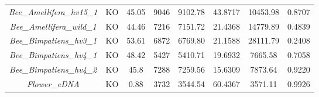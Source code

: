 \documentclass[11pt]{article}
\begin{document}
\begin{table}[H]
{\begin{tabular}{cccccccc}
\textit{Bee\_Amellifera\_hv15\_1}&KO     &45.05 &9046& 9102.78     & 43.8717 & 10453.98& 0.8707 \\
\textit{Bee\_Amellifera\_wild\_1}&KO     &44.46 &7216& 7151.72     & 21.4368 & 14779.89& 0.4839 \\
\textit{Bee\_Bimpatiens\_hv3\_1} &KO     &53.61 &6872& 6769.80     & 21.1588 & 28111.79& 0.2408 \\
\textit{Bee\_Bimpatiens\_hv4\_1} &KO     &48.42 &5427& 5410.71     & 19.6932 & 7665.58 & 0.7058 \\
\textit{Bee\_Bimpatiens\_hv4\_2} &KO     &45.8  &7288& 7259.56     & 15.6309 & 7873.64 & 0.9220 \\
\textit{Flower\_eDNA}            &KO     &0.88  &3732& 3544.54     & 60.4367 & 3571.11 & 0.9926 \\
      \bottomrule
      \end{tabular}%
      }
      \end{table}
\end{document}
